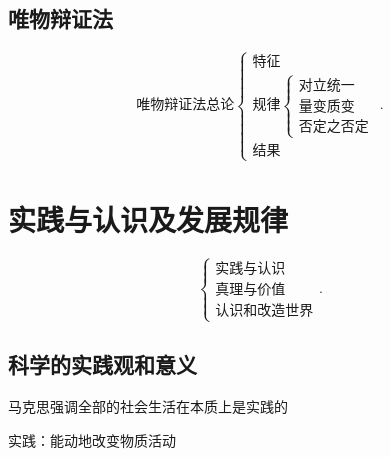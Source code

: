 
\subsection{唯物辩证法}%
\label{sub:唯物辩证法}
\[
    \text{唯物辩证法总论}
    \begin{cases}
        \text{特征}\\
        \text{规律}\begin{cases}
            \text{对立统一}\\
            \text{量变质变}\\
            \text{否定之否定}
        \end{cases}\\
        \text{结果}
    \end{cases}
.\] 
\section{实践与认识及发展规律}%
\label{sec:实践与认识及发展规律}
\[
    \begin{cases}
        \text{实践与认识}\\
        \text{真理与价值}\\
        \text{认识和改造世界}
    \end{cases}
.\] 
\subsection{科学的实践观和意义}%
\label{sub:科学的实践观和意义}
\begin{notation}
    马克思强调全部的社会生活在本质上是实践的
\end{notation}
\begin{defi}
    实践：能动地改变物质活动
\end{defi}


